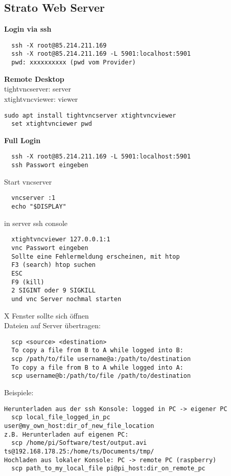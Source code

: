 \subsection{Strato Web Server}
\textbf{Login via ssh}
\begin{verbatim}
  ssh -X root@85.214.211.169
  ssh -X root@85.214.211.169 -L 5901:localhost:5901
  pwd: xxxxxxxxxx (pwd vom Provider)
\end{verbatim}
\textbf{Remote Desktop}\\
tightvncserver: server\\
xtightvncviewer: viewer
\begin{verbatim}sudo apt install tightvncserver xtightvncviewer
  set xtightvnciewer pwd
\end{verbatim}

\textbf{Full Login}
\begin{verbatim}
  ssh -X root@85.214.211.169 -L 5901:localhost:5901
  ssh Passwort eingeben
\end{verbatim}
Start vncserver
\begin{verbatim}
  vncserver :1
  echo "$DISPLAY"
\end{verbatim}
in server ssh console
\begin{verbatim}
  xtightvncviewer 127.0.0.1:1
  vnc Passwort eingeben
  Sollte eine Fehlermeldung erscheinen, mit htop
  F3 (search) htop suchen 
  ESC
  F9 (kill)
  2 SIGINT oder 9 SIGKILL
  und vnc Server nochmal starten
\end{verbatim}
X Fenster sollte sich öffnen\\

Dateien auf Server übertragen:
\begin{verbatim}
  scp <source> <destination>
  To copy a file from B to A while logged into B:
  scp /path/to/file username@a:/path/to/destination
  To copy a file from B to A while logged into A:
  scp username@b:/path/to/file /path/to/destination
\end{verbatim}
Beispiele:
\begin{verbatim}
Herunterladen aus der ssh Konsole: logged in PC -> eigener PC
  scp local_file_logged_in_pc user@my_own_host:dir_of_new_file_location
z.B. Herunterladen auf eigenen PC:
  scp /home/pi/Software/test/output.avi ts@192.168.178.25:/home/ts/Documents/tmp/
Hochladen aus lokaler Konsole: PC -> remote PC (raspberry)
  scp path_to_my_local_file pi@pi_host:dir_on_remote_pc
\end{verbatim}


